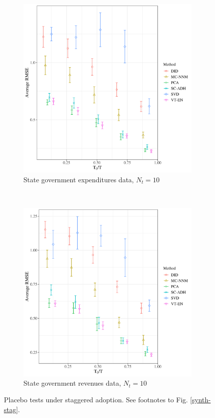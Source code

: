 \documentclass[12pt]{article}
\begin{document}
\begin{figure}[htbp]
	\centering
	\begin{subfigure}[t]{0.45\textwidth}
		\centering
		\includegraphics[width=\textwidth]{plots/exp_pc_N_19_T_159_numruns_20_num_treated_10_simultaneuous_0.png}
		\caption{State government expenditures data, $N_t = 10$} 
	\end{subfigure}
	~ 
	\begin{subfigure}[t]{0.45\textwidth}
		\centering
		\includegraphics[width=\textwidth]{plots/rev_pc_N_19_T_158_numruns_20_num_treated_10_simultaneuous_0.png}
		\caption{State government revenues data, $N_t = 10$}
	\end{subfigure}
	\caption{Placebo tests under staggered adoption. See footnotes to Fig. \ref{synth-stag}. \label{mc-stag}} 
\end{figure}
\end{document}

